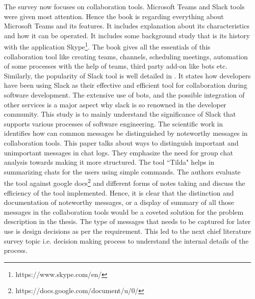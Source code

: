 The survey now focuses on collaboration tools. Microsoft Teams and Slack tools were given most attention. Hence the book \cite{hubbard_mastering_2018} is regarding everything about Microsoft Teams and its features. It includes explanation about its characteristics and how it can be operated. It includes some background study that is its history with the application Skype\footnote{https://www.skype.com/en/}. The book gives all the essentials of this collaboration tool like creating teams, channels, scheduling meetings, automation of some processes with the help of teams, third party add-on like bots etc. Similarly, the popularity of Slack tool is well detailed in \cite{lin_why_2016}. It states how developers have been using Slack as their effective and efficient tool for collaboration during software development. The extensive use of bots, and the possible integration of other services is a major aspect why slack is so renowned in the developer community. This study is to mainly understand the significance of Slack that supports various processes of software engineering. The scientific work in \cite{zhang_making_2018} identifies how can common messages be distinguished by noteworthy messages in collaboration tools. This paper talks about ways to distinguish important and unimportant messages in chat logs. They emphasize the need for group chat analysis towards making it more structured. The tool ``Tilda" helps in summarizing chats for the users using simple commands. The authors evaluate the tool against google docs\footnote{https://docs.google.com/document/u/0/} and different forms of notes taking and discuss the efficiency of the tool implemented. Hence, it is clear that the distinction and documentation of noteworthy messages, or a display of summary of all those messages in the collaboration tools would be a coveted solution for the problem description in the thesis. The type of messages that needs to be captured for later use is design decisions as per the requirement. This led to the next chief literature survey topic i.e. decision making process to understand the internal details of the process.

